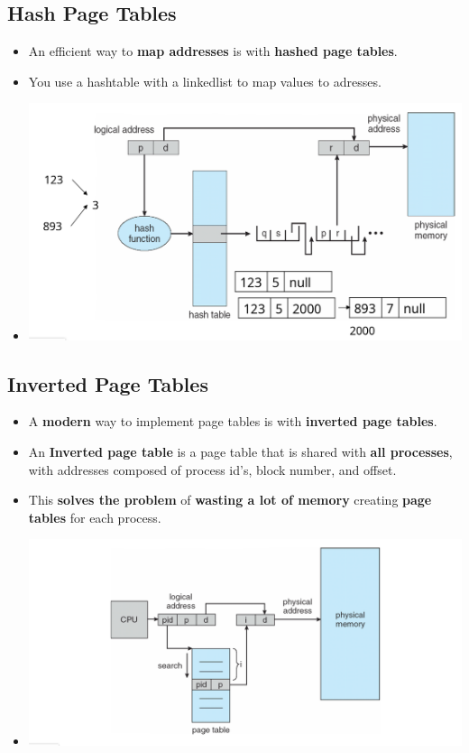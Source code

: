 \documentclass{article}
\begin{document}
    \subsection*{Hash Page Tables}
    \begin{itemize}
        \item An efficient way to \textbf{map addresses} is with \textbf{hashed page tables}.
        \item You use a hashtable with a linkedlist to map values to adresses.
        \item[] \includegraphics[width=\textwidth - 25pt]{images/Hash-Page-Table.png}
    \end{itemize}

    \subsection*{Inverted Page Tables}
    \begin{itemize}
        \item A \textbf{modern} way to implement page tables is with \textbf{inverted page tables}.
        \item An \textbf{Inverted page table} is a page table that is shared with \textbf{all processes}, with addresses composed of process id's, block number, and offset.
        \item This \textbf{solves the problem} of \textbf{wasting a lot of memory} creating \textbf{page tables} for each process.
        \item[] \includegraphics[width=\textwidth - 25pt]{images/Inverted-Page-Table.png}
    \end{itemize}
\end{document}

